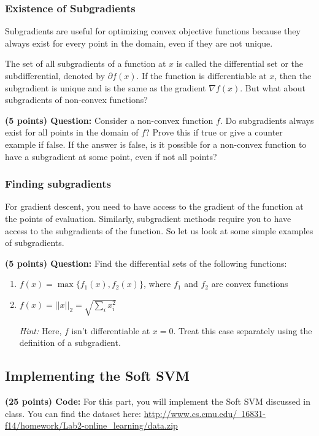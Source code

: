 \documentclass{article}
\begin{document}
\subsubsection{Existence of Subgradients}
Subgradients are useful for optimizing convex objective functions because they always exist for every point in the domain, even if they are not unique.

The set of all subgradients of a function at $x$ is called the differential set or the subdifferential, denoted by $\partial f(x)$.
If the function is differentiable at $x$, then the subgradient is unique and is the same as the gradient $\nabla f(x)$.
But what about subgradients of non-convex functions?

\noindent\textbf{(5 points) Question:} Consider a non-convex function $f$. Do subgradients always exist for all points in the domain of $f$? Prove this if true or give a counter example if false. If the answer is false, is it possible for a non-convex function to have a subgradient at some point, even if not all points? 

\subsubsection{Finding subgradients}
For gradient descent, you need to have access to the gradient of the function at the points of evaluation.
Similarly, subgradient methods require you to have access to the subgradients of the function.
So let us look at some simple examples of subgradients.

\noindent\textbf{(5 points) Question:} Find the differential sets of the following functions:
\begin{enumerate}
\item $f(x) = \max\{f_1(x), f_2(x)\}$, where $f_1$ and $f_2$ are convex functions
\item $f(x) = ||x||_2 = \sqrt{ \sum_i x_i^2}$

\textit{Hint:} Here, $f$ isn't differentiable at $x=0$. Treat this case separately using the definition of a subgradient.

\end{enumerate}

\subsection{Implementing the Soft SVM} 

\textbf{(25 points) Code:} For this part, you will implement the Soft SVM discussed in class. You can find the dataset here: \href{http://www.cs.cmu.edu/~16831-f14/homework/Lab2-online_learning/data.zip}{http://www.cs.cmu.edu/~16831-f14/homework/Lab2-online\_learning/data.zip}
\end{document}
